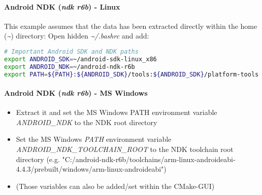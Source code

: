 \paragraph{Android NDK (\emph{ndk r6b}) - Linux}
This example assumes that the data has been extracted directly within the home (\emph{\textasciitilde}) directory: Open hidden \emph{\textasciitilde /.bashrc} and add:
\begin{lstlisting}[language=sh]
# Important Android SDK and NDK paths
export ANDROID_SDK=~/android-sdk-linux_x86
export ANDROID_NDK=~/android-ndk-r6b
export PATH=${PATH}:${ANDROID_SDK}/tools:${ANDROID_SDK}/platform-tools:~/${ANDROID_NDK}
\end{lstlisting}


\paragraph{Android NDK (\emph{ndk r6b}) - MS Windows}
\begin{itemize}
\item{Extract it and set the MS Windows PATH environment variable \emph{ANDROID\_NDK} to the NDK root directory}
\item{Set the MS Windows \emph{PATH} environment variable \emph{ANDROID\_NDK\_TOOLCHAIN\_ROOT} to the NDK toolchain root directory (e.g. "C:/android-ndk-r6b/toolchains/arm-linux-androideabi-4.4.3/prebuilt/windows/arm-linux-androideabi")}
\item{(Those variables can also be added/set within the CMake-GUI)}
\end{itemize}


